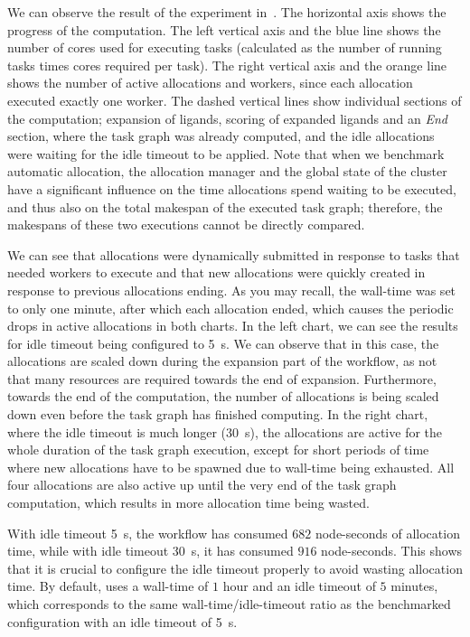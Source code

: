 We can observe the result of the experiment in~. The horizontal axis shows
the progress of the computation. The left vertical axis and the blue line shows the number of cores
used for executing tasks (calculated as the number of running tasks times cores required per task).
The right vertical axis and the orange line shows the number of active allocations and workers,
since each allocation executed exactly one worker. The dashed vertical lines show individual
sections of the computation; expansion of ligands, scoring of expanded ligands and an
\emph{End} section, where the task graph was already computed, and the idle
allocations were waiting for the idle timeout to be applied. Note that when we benchmark automatic
allocation, the allocation manager and the global state of the cluster have a significant influence
on the time allocations spend waiting to be executed, and thus also on the total makespan of the
executed task graph; therefore, the makespans of these two executions cannot be directly compared.

We can see that allocations were dynamically submitted in response to tasks that needed workers to
execute and that new allocations were quickly created in response to previous allocations ending.
As you may recall, the wall-time was set to only one minute, after which each allocation ended,
which causes the periodic drops in active allocations in both charts. In the left chart, we can see
the results for idle timeout being configured to \SI{5}{\second}. We can observe that in
this case, the allocations are scaled down during the expansion part of the workflow, as not that
many resources are required towards the end of expansion. Furthermore, towards the end of the
computation, the number of allocations is being scaled down even before the task graph has finished
computing. In the right chart, where the idle timeout is much longer (\SI{30}{\second}), the
allocations are active for the whole duration of the task graph execution, except for short periods
of time where new allocations have to be spawned due to wall-time being exhausted. All four
allocations are also active up until the very end of the task graph computation, which results in
more allocation time being wasted.

With idle timeout \SI{5}{\second}, the workflow has consumed $682$
node-seconds of allocation time, while with idle timeout \SI{30}{\second}, it has consumed
$916$ node-seconds. This shows that it is crucial to configure the idle timeout
properly to avoid wasting allocation time. By default, \hyperqueue{} uses a wall-time of
$1$ hour and an idle timeout of $5$ minutes, which
corresponds to the same wall-time/idle-timeout ratio as the benchmarked configuration with an idle
timeout of \SI{5}{\second}.

